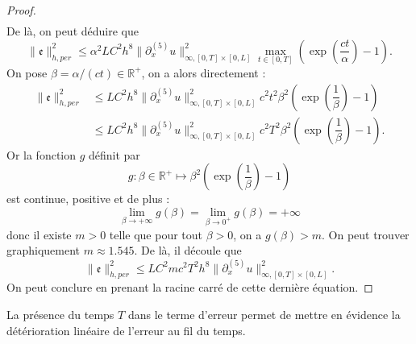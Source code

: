 \begin{proof}
\begin{align*}
\end{align*}
De là, on peut déduire que
\begin{equation}
\|\mathfrak{e}\|_{h,per}^2 \leq \alpha^2 L C^2 h^8  \| \partial_x^{(5)} u \|_{\infty,[0,T] \times [0,L]}^2 \max_{t \in [0,T]} \left( \exp \left( \dfrac{ct}{\alpha} \right) -1  \right).
\end{equation}
On pose $\beta = \alpha/(ct) \in \mathbb{R}^+$, on a alors directement :
\begin{align*}
\|\mathfrak{e}\|_{h,per}^2 & \leq L C^2 h^8  \| \partial_x^{(5)} u \|_{\infty,[0,T] \times [0,L]}^2 c^2 t^2 \beta^2 \left( \exp \left( \dfrac{1}{\beta} \right) -1  \right) \\
      & \leq L C^2 h^8  \| \partial_x^{(5)} u \|_{\infty,[0,T] \times [0,L]}^2 c^2 T^2 \beta^2 \left( \exp \left( \dfrac{1}{\beta} \right) -1  \right).
\end{align*}
Or la fonction $g$ définit par
\begin{equation}
g :\beta \in \mathbb{R}^+ \mapsto \beta^2 \left( \exp \left( \dfrac{1}{\beta} \right) -1  \right)
\end{equation}
est continue, positive et de plus :
\begin{equation}
\lim_{\beta \rightarrow + \infty} g(\beta) = \lim_{\beta \rightarrow 0^+} g(\beta) = + \infty
\end{equation}
donc il existe $m > 0$ telle que pour tout $\beta > 0$, on a $g(\beta)>m$. On peut trouver graphiquement $m \approx 1.545$. De là, il découle que
\begin{equation*}
\|\mathfrak{e}\|_{h,per}^2 \leq L C^2 m c^2 T^2 h^8  \| \partial_x^{(5)} u \|_{\infty,[0,T] \times [0,L]}^2.
\end{equation*}
On peut conclure en prenant la racine carré de cette dernière équation.
\end{proof}

La présence du temps $T$ dans le terme d'erreur permet de mettre en évidence la détérioration linéaire de l'erreur au fil du temps. 

